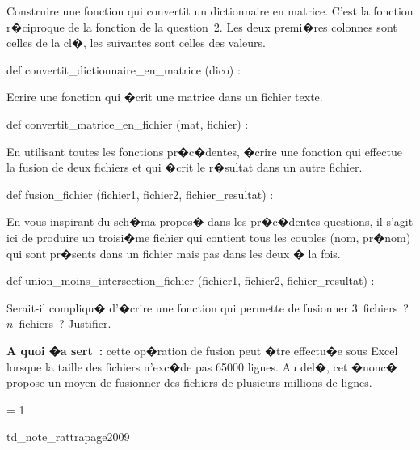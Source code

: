 \begin{xexercicenot}
\exequest Construire une fonction qui convertit un dictionnaire en matrice. C'est la fonction r�ciproque de la fonction de la question~2. Les deux premi�res colonnes sont celles de la cl�, les suivantes sont celles des valeurs.
\vspace{-0.15cm}

\begin{verbatimx}
def convertit_dictionnaire_en_matrice (dico) :
\end{verbatimx}
\vspace{-0.15cm}

\exequest Ecrire une fonction qui �crit une matrice dans un fichier texte.
\vspace{-0.15cm}

\begin{verbatimx}
def convertit_matrice_en_fichier (mat, fichier) :
\end{verbatimx}
\vspace{-0.15cm}

\exequest En utilisant toutes les fonctions pr�c�dentes, �crire une fonction qui effectue la fusion de deux fichiers et qui �crit le r�sultat dans un autre fichier.
\vspace{-0.15cm}

\begin{verbatimx}
def fusion_fichier (fichier1, fichier2, fichier_resultat) :
\end{verbatimx}
\vspace{-0.15cm}

\exequest En vous inspirant du sch�ma propos� dans les pr�c�dentes questions, il s'agit ici de produire un troisi�me fichier qui contient tous les couples (nom, pr�nom) qui sont pr�sents dans un fichier mais pas dans les deux � la fois.

\vspace{-0.15cm}
\begin{verbatimx}
def union_moins_intersection_fichier (fichier1, fichier2, fichier_resultat) :
\end{verbatimx}

\exequest Serait-il compliqu� d'�crire une fonction qui permette de fusionner 3~fichiers~? $n$~fichiers~? Justifier.

\textbf{A quoi �a sert~:} cette op�ration de fusion peut �tre effectu�e sous Excel lorsque la taille des fichiers n'exc�de pas 65000 lignes. Au del�, cet �nonc� propose un moyen de fusionner des fichiers de plusieurs millions de lignes.

\end{xexercicenot}





\ifnum\correctionenonce = 1

\begin{xdemoexonot}{td_note_rattrapage2009}

\bigskip
{}

\end{xdemoexonot}
\fi

%
